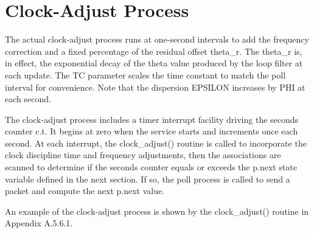 \chapter{Clock-Adjust Process}

The actual clock-adjust process runs at one-second intervals to add
the frequency correction and a fixed percentage of the residual
offset theta_r.  The theta_r is, in effect, the exponential decay of
the theta value produced by the loop filter at each update.  The TC
parameter scales the time constant to match the poll interval for
convenience.  Note that the dispersion EPSILON increases by PHI at
each second.

The clock-adjust process includes a timer interrupt facility driving
the seconds counter c.t.  It begins at zero when the service starts
and increments once each second.  At each interrupt, the
clock_adjust() routine is called to incorporate the clock discipline
time and frequency adjustments, then the associations are scanned to
determine if the seconds counter equals or exceeds the p.next state
variable defined in the next section.  If so, the poll process is
called to send a packet and compute the next p.next value.

An example of the clock-adjust process is shown by the clock_adjust()
routine in Appendix A.5.6.1.
